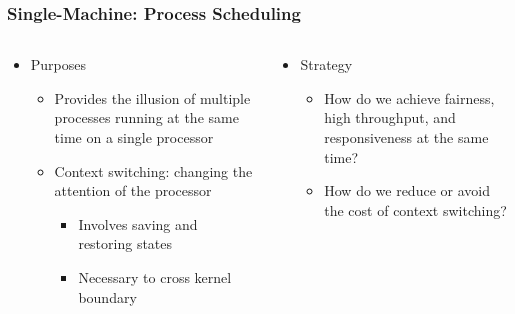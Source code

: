 \begin{frame}[plain,t]
	\frametitle{Single-Machine: Process Scheduling}
	\begin{columns}[t]
		\begin{column}{.5\textwidth}
			
			\begin{itemize}\Large
				\item Purposes
				\begin{itemize}\large
					\item Provides the illusion of multiple
					processes running at the same
					time on a single processor
					\item Context switching: changing the
					attention of the processor
					\begin{itemize}\large
						\item Involves saving and restoring
						states
						\item Necessary to cross kernel
						boundary
					\end{itemize}
				\end{itemize}
			\end{itemize}
			
		\end{column}\pause
		
		\begin{column}{.5\textwidth}
			
			\begin{itemize}\Large
				\item Strategy
				\begin{itemize}\large
					\item How do we achieve fairness,
					high throughput, and
					responsiveness at the same
					time?
					\item How do we reduce or avoid the
					cost of context switching?
					
				\end{itemize}
			\end{itemize}
			
		\end{column}
	\end{columns}
\end{frame}

